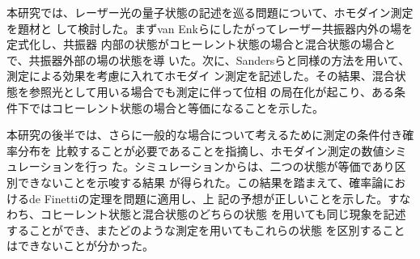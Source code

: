 \documentclass[10pt]{jsarticle}
\begin{document}
本研究では、レーザー光の量子状態の記述を巡る問題について、ホモダイン測定を題材と
して検討した。まずvan Enkらにしたがってレーザー共振器内外の場を定式化し、共振器
内部の状態がコヒーレント状態の場合と混合状態の場合とで、共振器外部の場の状態を導
いた。次に、Sandersらと同様の方法を用いて、測定による効果を考慮に入れてホモダイ
ン測定を記述した。その結果、混合状態を参照光として用いる場合でも測定に伴って位相
の局在化が起こり、ある条件下ではコヒーレント状態の場合と等価になることを示した。

本研究の後半では、さらに一般的な場合について考えるために測定の条件付き確率分布を
比較することが必要であることを指摘し、ホモダイン測定の数値シミュレーションを行っ
た。シミュレーションからは、二つの状態が等価であり区別できないことを示唆する結果
が得られた。この結果を踏まえて、確率論におけるde Finettiの定理を問題に適用し、上
記の予想が正しいことを示した。すなわち、コヒーレント状態と混合状態のどちらの状態
を用いても同じ現象を記述することができ、またどのような測定を用いてもこれらの状態
を区別することはできないことが分かった。
\end{document}
